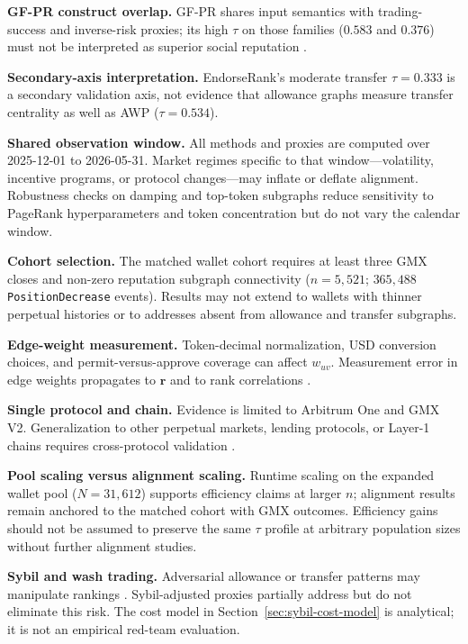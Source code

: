 \textbf{GF-PR construct overlap.} GF-PR shares input semantics with trading-success and inverse-risk proxies; its high $\tau$ on those families ($0.583$ and $0.376$) must not be interpreted as superior social reputation .

\textbf{Secondary-axis interpretation.} EndorseRank's moderate transfer $\tau=0.333$ is a secondary validation axis, not evidence that allowance graphs measure transfer centrality as well as AWP ($\tau=0.534$).


\textbf{Shared observation window.} All methods and proxies are computed over 2025-12-01 to 2026-05-31. Market regimes specific to that window---volatility, incentive programs, or protocol changes---may inflate or deflate alignment. Robustness checks on damping and top-token subgraphs reduce sensitivity to PageRank hyperparameters and token concentration but do not vary the calendar window.

\textbf{Cohort selection.} The matched wallet cohort requires at least three GMX closes and non-zero reputation subgraph connectivity ($n=5{,}521$; $365{,}488$ \texttt{PositionDecrease} events). Results may not extend to wallets with thinner perpetual histories or to addresses absent from allowance and transfer subgraphs.

\textbf{Edge-weight measurement.} Token-decimal normalization, USD conversion choices, and permit-versus-approve coverage can affect $w_{uv}$. Measurement error in edge weights propagates to $\mathbf{r}$ and to rank correlations .


\textbf{Single protocol and chain.} Evidence is limited to Arbitrum One and GMX V2. Generalization to other perpetual markets, lending protocols, or Layer-1 chains requires cross-protocol validation .

\textbf{Pool scaling versus alignment scaling.} Runtime scaling on the expanded wallet pool ($N=31{,}612$) supports efficiency claims at larger $n$; alignment results remain anchored to the matched cohort with GMX outcomes. Efficiency gains should not be assumed to preserve the same $\tau$ profile at arbitrary population sizes without further alignment studies.


\textbf{Sybil and wash trading.} Adversarial allowance or transfer patterns may manipulate rankings . Sybil-adjusted proxies partially address but do not eliminate this risk. The cost model in Section~\ref{sec:sybil-cost-model} is analytical; it is not an empirical red-team evaluation.

